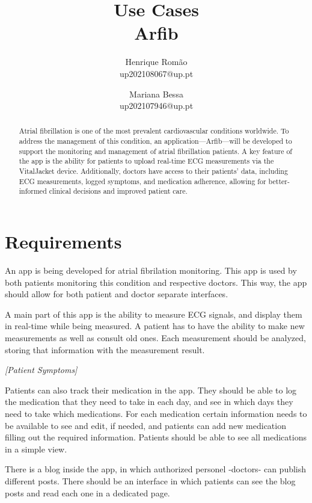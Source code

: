\documentclass{report}
\title{\Huge \textbf{Use Cases}\\ \huge Arfib}
\author{
    Henrique Romão \\ up202108067@up.pt
    \and
    Mariana Bessa \\ up202107946@up.pt
}
\begin{document}
\maketitle

\begin{abstract}
    Atrial fibrillation is one of the most prevalent cardiovascular conditions worldwide.
     To address the management of this condition, an application—Arfib—will be developed to support the monitoring and management of atrial fibrillation patients. 
     A key feature of the app is the ability for patients to upload real-time ECG measurements via the VitalJacket device. 
     Additionally, doctors have access to their patients' data, including ECG measurements, logged symptoms, and medication adherence, allowing for better-informed clinical decisions and improved patient care.
    
    \end{abstract}
    \tableofcontents

\chapter{Requirements}
An app is being developed for atrial fibrilation monitoring.
This app is used by both patients monitoring this condition and respective doctors. 
This way, the app should allow for both patient and doctor separate interfaces.

A main part of this app is the ability to measure ECG signals, and display them in real-time while being measured.
A patient has to have the ability to make new measurements as well as consult old ones.
Each measurement should be analyzed, storing that information with the measurement result.

\textit{[Patient Symptoms]}

Patients can also track their medication in the app.
They should be able to log the medication that they need to take in each day, and see in which days they need to take which medications.
For each medication certain information needs to be available to see and edit, if needed, and patients can add new medication filling out the required information.
Patients should be able to see all medications in a simple view.

There is a blog inside the app, in which authorized personel -doctors- can publish different posts.
There should be an interface in which patients can see the blog posts and read each one in a dedicated page.
\end{document}

